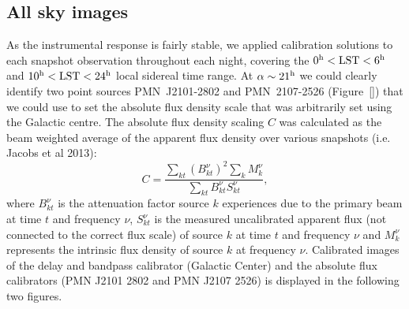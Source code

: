 \documentclass[a0,portrait]{a0poster}
\begin{document}
\begin{multicols}{2}
\subsection*{All sky images}
As the instrumental response is fairly stable, we applied calibration solutions to each snapshot observation throughout each night, covering the $0^{\rm h} < {\rm LST} < 6^{\rm h}$ and $10^{\rm h} < {\rm LST} < 24^{\rm h}$ local sidereal time range. At $\alpha \sim 21^{\rm h}$ we could clearly identify two point sources PMN~J2101-2802 and PMN~2107-2526 (Figure~\ref{}) that we could use to set the absolute flux density scale that was arbitrarily set using the Galactic centre. The absolute flux density scaling $C$ was calculated as the beam weighted average of the apparent flux density over various snapshots (i.e. Jacobs et al 2013):
\begin{equation}
C = \frac{\sum_{kt}(B_{kt}^{\nu})^2\sum_k{M_{k}^{\nu}}}{\sum_{kt}B_{kt}^{\nu}S_{kt}^{\nu}},\label{eq:c}
\end{equation}
where $B_{kt}^{\nu}$ is the attenuation factor source $k$ experiences due to the primary beam at time $t$ and frequency $\nu$,
$S_{kt}^{\nu}$ is the measured uncalibrated apparent flux (not connected to the correct flux scale) of source $k$ at time $t$ and frequency $\nu$ and $M_{k}^{\nu}$ represents the 
intrinsic flux density of source $k$ at frequency $\nu$. 
Calibrated images of the delay and bandpass calibrator (Galactic Center) and the absolute flux calibrators (PMN J2101 2802 and PMN J2107 2526) is displayed in
the following two figures. 

  

\end{multicols}
\end{document}
